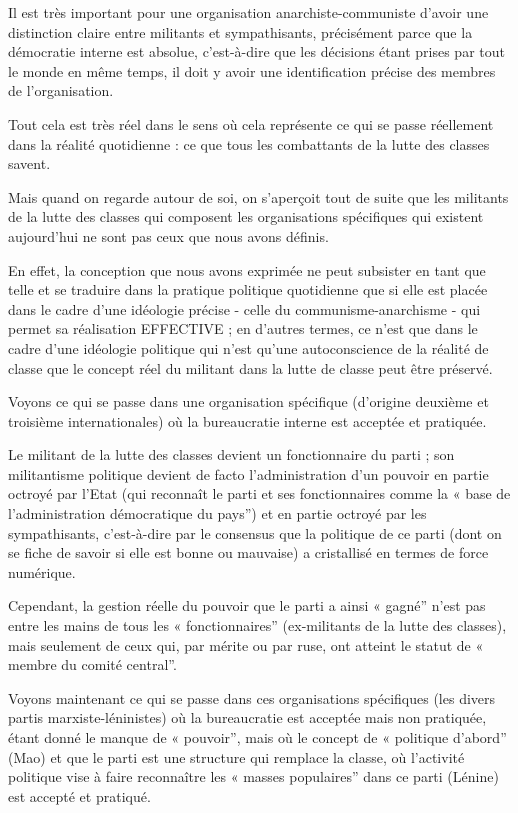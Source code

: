 Il est très important pour une organisation anarchiste-communiste d'avoir une distinction claire entre militants et sympathisants, précisément parce que la démocratie interne est absolue, c'est-à-dire que les décisions étant prises par tout le monde en même temps, il doit y avoir une identification précise des membres de l'organisation.

Tout cela est très réel dans le sens où cela représente ce qui se passe réellement dans la réalité quotidienne : ce que tous les combattants de la lutte des classes savent.

Mais quand on regarde autour de soi, on s'aperçoit tout de suite que les militants de la lutte des classes qui composent les organisations spécifiques qui existent aujourd'hui ne sont pas ceux que nous avons définis.

En effet, la conception que nous avons exprimée ne peut subsister en tant que telle et se traduire dans la pratique politique quotidienne que si elle est placée dans le cadre d'une idéologie précise - celle du communisme-anarchisme - qui permet sa réalisation EFFECTIVE ; en d'autres termes, ce n'est que dans le cadre d'une idéologie politique qui n'est qu'une autoconscience de la réalité de classe que le concept réel du militant dans la lutte de classe peut être préservé.

Voyons ce qui se passe dans une organisation spécifique (d'origine deuxième et troisième internationales) où la bureaucratie interne est acceptée et pratiquée.

Le militant de la lutte des classes devient un fonctionnaire du parti ; son militantisme politique devient de facto l'administration d'un pouvoir en partie octroyé par l'Etat (qui reconnaît le parti et ses fonctionnaires comme la « base de l'administration démocratique du pays'') et en partie octroyé par les sympathisants, c'est-à-dire par le consensus que la politique de ce parti (dont on se fiche de savoir si elle est bonne ou mauvaise) a cristallisé en termes de force numérique.

Cependant, la gestion réelle du pouvoir que le parti a ainsi « gagné'' n'est pas entre les mains de tous les « fonctionnaires'' (ex-militants de la lutte des classes), mais seulement de ceux qui, par mérite ou par ruse, ont atteint le statut de « membre du comité central''.

Voyons maintenant ce qui se passe dans ces organisations spécifiques (les divers partis marxiste-léninistes) où la bureaucratie est acceptée mais non pratiquée, étant donné le manque de « pouvoir'', mais où le concept de « politique d'abord'' (Mao) et que le parti est une structure qui remplace la classe, où l'activité politique vise à faire reconnaître les « masses populaires'' dans ce parti (Lénine) est accepté et pratiqué.

